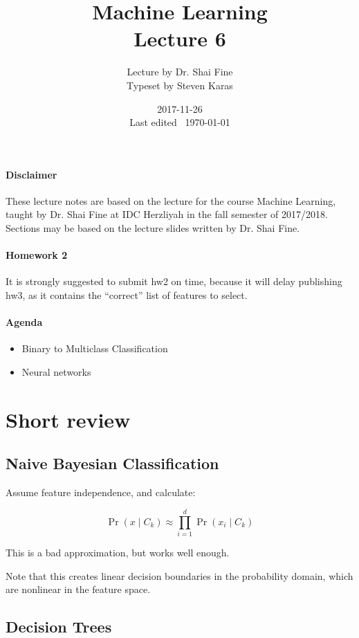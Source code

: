 \documentclass{idc_msc}
\title{Machine Learning\\\large Lecture 6}
\date{2017-11-26 \\ Last edited \currenttime\ \today}
\author{Lecture by Dr. Shai Fine\\Typeset by Steven Karas}
\begin{document}
\maketitle

\paragraph{Disclaimer}

These lecture notes are based on the lecture for the course Machine Learning, taught by Dr. Shai Fine at IDC Herzliyah in the fall semester of 2017/2018.
Sections may be based on the lecture slides written by Dr. Shai Fine.

\paragraph{Homework 2}

It is strongly suggested to submit hw2 on time, because it will delay publishing hw3, as it contains the ``correct'' list of features to select.

\paragraph{Agenda}

\begin{itemize}
  \item Binary to Multiclass Classification
  \item Neural networks
\end{itemize}

\section{Short review}

\subsection{Naive Bayesian Classification}

Assume feature independence, and calculate:

\[\Pr(x \mid C_k) \approx \prod_{i=1}^d \Pr(x_i \mid C_k)\]

This is a bad approximation, but works well enough.

Note that this creates linear decision boundaries in the probability domain, which are nonlinear in the feature space.

\subsection{Decision Trees}
\end{document}
